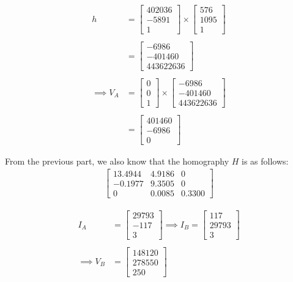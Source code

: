 \documentclass[12pt, oneside]{article}
\begin{document}
\begin{align*}
h   &=  \begin{bmatrix} 402036  \\ -5891 \\ 1  \end{bmatrix} \times 
        \begin{bmatrix} 576   \\ 1095   \\   1   \end{bmatrix} \\ \\
    &=  \begin{bmatrix} -6986   \\ -401460   \\ 443622636   \end{bmatrix}  \\ \\   
\implies V_A  &=  \begin{bmatrix} 0   \\ 0   \\ 1   \end{bmatrix} \times  
        \begin{bmatrix} -6986   \\ -401460   \\ 443622636 \end{bmatrix} \\ \\
    &=  \begin{bmatrix} 401460   \\ -6986   \\ 0   \end{bmatrix} 
\end{align*}

From the previous part, we also know that the homography $H$ is as follows:
\begin{align*}
\begin{bmatrix}
    13.4944     &  4.9186   & 0 \\
    -0.1977     &  9.3505   & 0 \\
    0           & 0.0085  & 0.3300
\end{bmatrix}
\end{align*}

\begin{align*}
I_A &= \begin{bmatrix} 29793 \\ -117 \\ 3 \end{bmatrix}  \implies 
I_B = \begin{bmatrix} 117 \\ 29793 \\ 3 \end{bmatrix}  \\ \\
\implies  V_B &= \begin{bmatrix} 148120 \\ 278550 \\ 250 \end{bmatrix}  
\end{align*}
\end{document}
